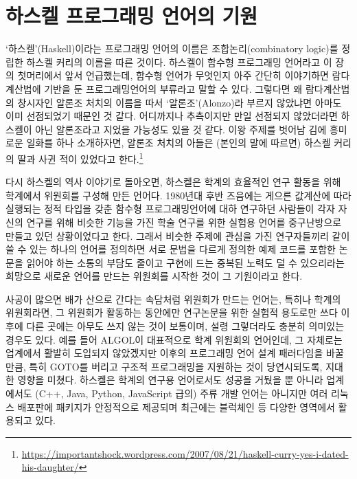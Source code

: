 \documentclass[b5paper,chapter,figtabcapt]{oblivoir}
\begin{document}
\section{하스켈 프로그래밍 언어의 기원}
`하스켈'(Haskell)이라는 프로그래밍 언어의 이름은 조합논리(combinatory logic)를 정립한 하스켈 커리의 이름을 따른 것이다.
하스켈이 함수형 프로그래밍 언어라고 이 장의 첫머리에서 앞서 언급했는데, 함수형 언어가
무엇인지 아주 간단히 이야기하면 람다계산법에 기반을 둔 프로그래밍언어의 부류라고 말할 수 있다.
그렇다면 왜 람다계산법의 창시자인 알론조 처치의 이름을 따서 `알론조'(Alonzo)라 부르지
않았냐면 아마도 이미 선점\cite{Ramsdell1989alonzo}되었기 때문인 것 같다. 어디까지나
추측이지만 만일 선점되지 않았더라면 하스켈이 아닌 알론조라고 지었을 가능성도 있을 것 같다.
이왕 주제를 벗어남 김에 흥미로운 일화를 하나 소개하자면, 알론조 처치의 아들은 (본인의 말에 따르면)
하스켈 커리의 딸과 사귄 적이 있었다고 한다.\footnote{%
\url{https://importantshock.wordpress.com/2007/08/21/haskell-curry-yes-i-dated-his-daughter/}}

다시 하스켈의 역사\cite{Hudak2007HistoryHaskell} 이야기로 돌아오면,
하스켈은 학계의 효율적인 연구 활동을 위해 학계에서 위원회를 구성해 만든 언어다.
1980년대 후반 즈음에는 게으른 값계산에 따라 실행되는 정적 타입을 갖춘
함수형 프로그래밍언어에 대하 연구하던 사람들이 각자 자신의 연구를 위해
비슷한 기능을 가진 학술 연구를 위한 실험용 언어를 중구난방으로 만들고
있던 상황이었다고 한다. 그래서 비슷한 주제에 관심을 가진 연구자들끼리
같이 쓸 수 있는 하나의 언어를 정의하면 서로 문법을 다르게 정의한 예제
코드를 포함한 논문을 읽어야 하는 소통의 부담도 줄이고 구현에 드는 중복된
노력도 덜 수 있으리라는 희망으로 새로운 언어를 만드는 위원회를 시작한 것이
그 기원이라고 한다.

사공이 많으면 배가 산으로 간다는 속담처럼 위원회가 만드는 언어는,
특히나 학계의 위원회라면, 그 위원회가 활동하는 동안에만 연구논문을
위한 실험적 용도로만 쓰다 이후에 다른 곳에는 아무도 쓰지 않는 것이 보통이며,
설령 그렇더라도 충분히 의미있는 경우도 있다. 예를 들어 ALGOL이 대표적으로
학계 위원회의 언어인데, 그 자체로는 업계에서 활발히 도입되지 않았겠지만
이후의 프로그래밍 언어 설계 패러다임을 바꿀 만큼, 특히 GOTO를 버리고
구조적 프로그래밍을 지원하는 것이 당연시되도록, 지대한 영향을 미쳤다.
하스켈은 학계의 연구용 언어로서도 성공을 거뒀을 뿐 아니라 업계에서도
(C++, Java, Python, JavaScript 급의) 주류 개발 언어는 아니지만 여러
리눅스 배포판에 패키지가 안정적으로 제공되며 최근에는
블럭체인\cite{Seijas2020Marlowe} 등 다양한 영역에서 활용되고 있다.
\end{document}
